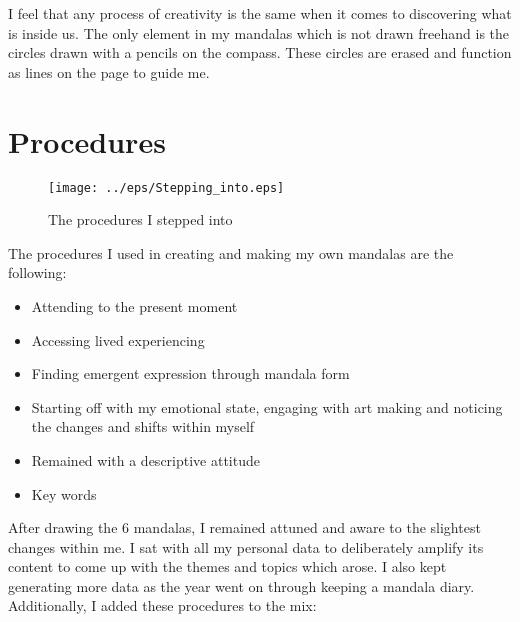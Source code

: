I feel that any process of creativity is the same when it comes to discovering what is inside us. The only element in my mandalas which is not drawn freehand is the circles drawn with a pencils on the compass. These circles are erased and function as lines on the page to guide me.  


\section{Procedures}


\begin{figure}[htbp]
\begin{center}
\texttt{[image: ../eps/Stepping\_into.eps]} 
\caption{The procedures I stepped into}
\label{label}
\end{center}
\end{figure}



The procedures I used in creating and making my own mandalas are the following:
\begin{itemize}
\item Attending to the present moment
\end{itemize}

\begin{itemize}
\item Accessing lived experiencing 
\end{itemize}

\begin{itemize}
\item Finding emergent expression through mandala form
\end{itemize}

\begin{itemize}
\item Starting off with my emotional state, engaging with art making and noticing the changes and shifts within myself
\end{itemize}

\begin{itemize}
\item Remained with a descriptive attitude 
\end{itemize}

\begin{itemize}
\item Key words
\end{itemize}


After drawing the 6 mandalas, I remained attuned and aware to the slightest changes within me. I sat with all my personal data to deliberately amplify its content to come up with the themes and topics which arose. I also kept generating more data as the year went on through keeping a mandala diary. 
Additionally, I added these procedures to the mix: 

